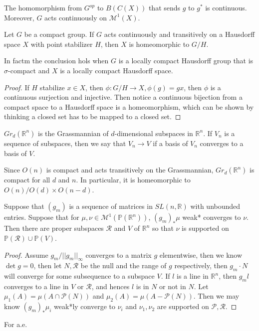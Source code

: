 \documentclass[lang=en, color=blue, ]{elegantbook}
\newcommand{\R}{\mathbb{R}}
\newcommand{\M}{\mathcal{M}}
\begin{document}
\begin{lemma}
    The homomorphism from $G^{op}$ to $B(C(X))$ that sends $g$ to $g^*$ is continuous. Moreover, $G$ acts continuously on $\M^1(X)$.
\end{lemma}

\begin{lemma}
    Let $G$ be a compact group. If $G$ acts continuously and transitively on a Hausdorff space $X$ with point stabilizer $H$, then $X$ is homeomorphic to $G/H$.\par
    In factm the conclusion hols when $G$ is a locally compact Hausdorff group that is $\sigma$-compact and $X$ is a locally compact Hausdorff space.
\end{lemma}

\begin{proof}\par
    If $H$ stabilize $x\in X$, then $\phi:G/H\to X, \phi(g) = gx$, then $\phi$ is a continuous surjection and injective. Then notice a continuous bijection from a compact space to a Hausdorff space is a homeomorphism, which can be shown by thinking a closed set has to be mapped to a closed set.
\end{proof}

\begin{definition}
    $Gr_d(\R^n)$ is the Grassmannian of $d$-dimensional subspaces in $\R^n$. If $V_n$ is a sequence of subspaces, then we say that $V_n\to V$ if a basis of $V_n$ converges to a basis of $V$.
\end{definition}

\begin{corollary}
    Since $O(n)$ is compact and acts transitively on the Grassmannian, $Gr_d(\R^n)$ is compact for all $d$ and $n$. In particular, it is homeomorphic to $O(n)/O(d)\times O(n-d)$.
\end{corollary}

\begin{lemma}
    Suppose that $(g_m)$ is a sequence of matrices in $SL(n,\R)$ with unbounded entries. Suppose that for $\mu,\nu \in \M^1(\mathbb{P}(\R^n))$, $(g_m)_*\mu$ weak* converges to $\nu$. Then there are proper subspaces $\mathcal{R}$ and $V$ of $\R^n$ so that $\nu$ is supported on $\mathbb{P}(\mathcal{R})\cup \mathbb{P}(V)$.
\end{lemma}

\begin{proof}
    Assume $g_m/||g_m||_{\infty}$ converges to a matrix $g$ elementwise, then we know $\det g = 0$, then let $N,\mathcal{R}$ be the null and the range of $g$ respectively, then $g_m\cdot N$ will converge for some subsequence to a subspace $V$. If $l$ is a line in $\R^n$, then $g_m l$ converges to a line in $V$ or $\mathcal{R}$, and hences $l$ is in $N$ or not in $N$. Let $\mu_1(A) = \mu(A\cap \mathcal{P}(N))$ and $\mu_2(A) = \mu(A- \mathcal{P}(N))$. Then we may know $(g_m)_*\mu_i$ weak*ly converge to $\nu_i$ and $\nu_1,\nu_2$ are supported on $\mathcal{P}, \mathcal{R}$. 
\end{proof}

\begin{definition}
    For a.e. $$
\end{definition}
\end{document}
